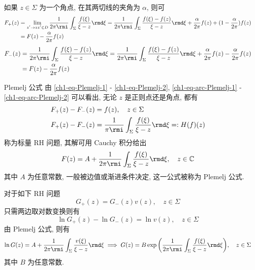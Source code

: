 \begin{remark}
    如果 $ z \in \Sigma $ 为一个角点, 在其两切线的夹角为 $ \alpha $, 则可
    \begin{equation}\begin{aligned}
            F_{+}(z) & = \lim_{\substack{z' \to z \newline z' \in D}} \frac{1}{2 \pi \rmi} \int_{\Sigma}  \frac{f(\xi)}{\xi - z}  \rmd \xi = \frac{1}{2 \pi \rmi} \int_{\Sigma}  \frac{f(\xi) - f(z)}{\xi - z}  \rmd \xi + \frac{\alpha}{2 \pi} f(z) + (1 - \frac{\alpha}{2 \pi}) f(z) \\
                     & = F(z) - \frac{\alpha}{2 \pi} f(z) \label{ch1-eq-arc-Plemelj-1}
        \end{aligned}\end{equation}
    \begin{equation}\begin{aligned}
            F_{-}(z) & = \frac{1}{2 \pi \rmi} \int_{\Sigma}  \frac{f(\xi) - f(z)}{\xi - z}  \rmd \xi = \frac{1}{2 \pi \rmi} \int_{\Sigma}  \frac{f(\xi) - f(z)}{\xi - z}  \rmd \xi + \frac{\alpha}{2 \pi} f(z) - \frac{\alpha}{2 \pi} f(z) \\
                     & = F(z) - \frac{\alpha}{2 \pi} f(z) \label{ch1-eq-arc-Plemelj-2}
        \end{aligned}\end{equation}
\end{remark}
\begin{definition}{Plemelj 公式}
    由 \eqref{ch1-eq-Plemelj-1} - \eqref{ch1-eq-Plemelj-2}, \eqref{ch1-eq-arc-Plemelj-1} - \eqref{ch1-eq-arc-Plemelj-2} 可以看出, 无论 $ z $ 是正则点还是角点, 都有
    \begin{align}
        F_{+}(z) - F_{-}(z) & = f(z), \quad z \in \Sigma                                                    \\
        F_{+}(z) - F_{-}(z) & = \frac{1}{\pi \rmi} \int_{\Sigma} \frac{f(\xi)}{\xi - z} \rmd \xi =: H(f)(z)
    \end{align}
    称为标量 RH 问题, 其解可用 Cauchy 积分给出
    \begin{equation}
        F(z) = A + \frac{1}{2 \pi \rmi} \int_{\Sigma} \frac{f(\xi)}{\xi - z} \rmd \xi, \quad z \in \mathbb{C}
    \end{equation}
    其中 $ A $ 为任意常数, 一般被边值或渐进条件决定, 这一公式被称为 Plemelj 公式.
\end{definition}


对于如下 RH 问题
\begin{equation}
    G_{+}(z) = G_{-}(z)v(z), \quad z\in \Sigma
\end{equation}
只需两边取对数变换则有
\begin{equation}
    \ln{G_{+}(z)}- \ln{G_{-}(z)} =  \ln{v(z)}, \quad z\in \Sigma
\end{equation}
由 Plemelj 公式, 则有
\begin{equation}
    \ln{G(z)} = A + \frac{1}{2 \pi \rmi} \int_{\Sigma} \frac{v(\xi)}{\xi - z} \rmd \xi \implies G(z) = B \exp{\left( \frac{1}{2 \pi \rmi} \int_{\Sigma} \frac{f(\xi)}{\xi - z} \rmd \xi \right)}, \quad z\in \Sigma
\end{equation}
其中 $ B $ 为任意常数.

